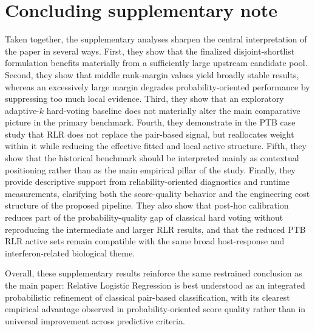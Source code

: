 \documentclass[11pt, a4paper]{article}
\begin{document}
\section*{Concluding supplementary note}

Taken together, the supplementary analyses sharpen the central interpretation of the paper in several ways. First, they show that the finalized disjoint-shortlist formulation benefits materially from a sufficiently large upstream candidate pool. Second, they show that middle rank-margin values yield broadly stable results, whereas an excessively large margin degrades probability-oriented performance by suppressing too much local evidence. Third, they show that an exploratory adaptive-$k$ hard-voting baseline does not materially alter the main comparative picture in the primary benchmark. Fourth, they demonstrate in the PTB case study that RLR does not replace the pair-based signal, but reallocates weight within it while reducing the effective fitted and local active structure. Fifth, they show that the historical benchmark should be interpreted mainly as contextual positioning rather than as the main empirical pillar of the study. Finally, they provide descriptive support from reliability-oriented diagnostics and runtime measurements, clarifying both the score-quality behavior and the engineering cost structure of the proposed pipeline. They also show that post-hoc calibration reduces part of the probability-quality gap of classical hard voting without reproducing the intermediate and larger RLR results, and that the reduced PTB RLR active sets remain compatible with the same broad host-response and interferon-related biological theme.

Overall, these supplementary results reinforce the same restrained conclusion as the main paper: Relative Logistic Regression is best understood as an integrated probabilistic refinement of classical pair-based classification, with its clearest empirical advantage observed in probability-oriented score quality rather than in universal improvement across predictive criteria.
\end{document}
